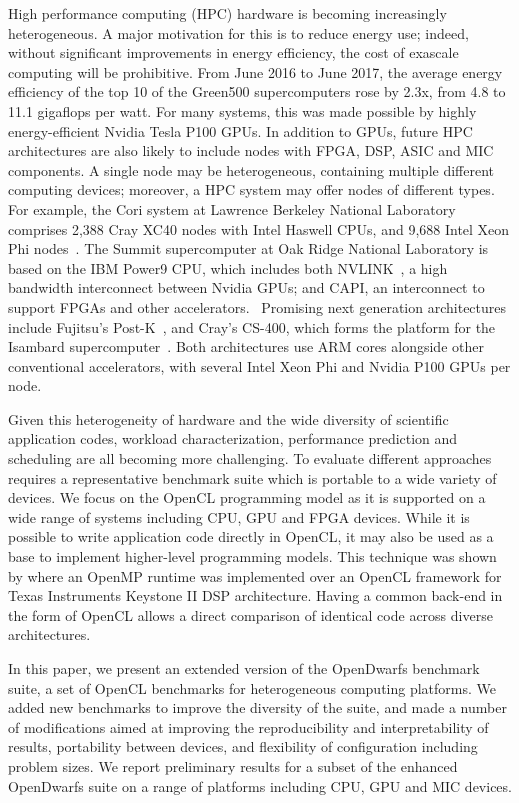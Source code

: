 \documentclass[../document.tex]{subfiles}
\begin{document}
\label{sec:introduction}
	
High performance computing (HPC) hardware is becoming increasingly heterogeneous.
A major motivation for this is to reduce energy use; indeed, without significant improvements in energy efficiency, the cost of exascale computing will be prohibitive.
From June 2016 to June 2017, the average energy efficiency of the top 10 of the Green500 supercomputers rose by 2.3x, from 4.8 to 11.1 gigaflops per watt.\cite{feldman_2017}
For many systems, this was made possible by highly energy-efficient Nvidia Tesla P100 GPUs.
In addition to GPUs, future HPC architectures are also likely to include nodes with FPGA, DSP, ASIC and MIC components.
A single node may be heterogeneous, containing multiple different computing devices; moreover, a HPC system may offer nodes of different types.
For example, the Cori system at Lawrence Berkeley National Laboratory comprises 2,388 Cray XC40 nodes with Intel Haswell CPUs, and 9,688 Intel Xeon Phi nodes~\cite{declerck2016cori}.
The Summit supercomputer at Oak Ridge National Laboratory is based on the IBM Power9 CPU, which includes both NVLINK~\cite{morgan_2016}, a high bandwidth interconnect between Nvidia GPUs; and CAPI, an interconnect to support FPGAs and other accelerators.~\cite{morgan_2017}
Promising next generation architectures include Fujitsu's Post-K~\cite{morgan_2016_postk}, and Cray's CS-400, which forms the platform for the Isambard supercomputer~\cite{feldman_2017_isambard}.
Both architectures use ARM cores alongside other conventional accelerators, with several Intel Xeon Phi and Nvidia P100 GPUs per node.

Given this heterogeneity of hardware and the wide diversity of scientific application codes, workload characterization, performance prediction and scheduling are all becoming more challenging.
To evaluate different approaches requires a representative benchmark suite which is portable to a wide variety of devices.
We focus on the OpenCL programming model as it is supported on a wide range of systems including CPU, GPU and FPGA devices.
While it is possible to write application code directly in OpenCL, it may also be used as a base to implement higher-level programming models.
This technique was shown by \citet{mitra2014implementation} where an OpenMP runtime was implemented over an OpenCL framework for Texas Instruments Keystone II DSP architecture.
Having a common back-end in the form of OpenCL allows a direct comparison of identical code across diverse architectures.

In this paper, we present an extended version of the OpenDwarfs benchmark suite, a set of OpenCL benchmarks for heterogeneous computing platforms.\cite{krommydas2016opendwarfs}
We added new benchmarks to improve the diversity of the suite, and made a number of modifications aimed at improving the reproducibility and interpretability of results, portability between devices, and flexibility of configuration including problem sizes.
We report preliminary results for a subset of the enhanced OpenDwarfs suite on a range of platforms including CPU, GPU and MIC devices.
\end{document}
